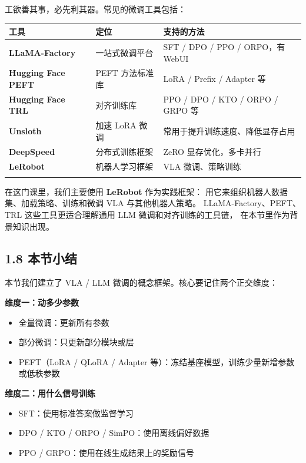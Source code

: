 \documentclass[
  chinese,
]{ctexart}
\providecommand{\tightlist}{%
  \setlength{\itemsep}{0pt}\setlength{\parskip}{0pt}}
\begin{document}
工欲善其事，必先利其器。常见的微调工具包括：

\begin{center}
\begin{tabular}{@{}>{\raggedright\arraybackslash}p{} >{\raggedright\arraybackslash}p{} >{\raggedright\arraybackslash}p{}@{}}
\toprule\noalign{}
工具 & 定位 & 支持的方法 \\
\midrule\noalign{}
\textbf{LLaMA-Factory} & 一站式微调平台 & SFT / DPO / PPO / ORPO，有 WebUI \\
\textbf{Hugging Face PEFT} & PEFT 方法标准库 & LoRA / Prefix / Adapter 等 \\
\textbf{Hugging Face TRL} & 对齐训练库 & PPO / DPO / KTO / ORPO / GRPO 等 \\
\textbf{Unsloth} & 加速 LoRA 微调 & 常用于提升训练速度、降低显存占用 \\
\textbf{DeepSpeed} & 分布式训练框架 & ZeRO 显存优化，多卡并行 \\
\textbf{LeRobot} & 机器人学习框架 & VLA 微调、策略训练 \\
\bottomrule\noalign{}
\end{tabular}
\end{center}

在这门课里，我们主要使用 \textbf{LeRobot} 作为实践框架：
用它来组织机器人数据集、加载策略、训练和微调 VLA 与其他机器人策略。
LLaMA-Factory、PEFT、TRL 这些工具更适合理解通用 LLM
微调和对齐训练的工具链， 在本节里作为背景知识出现。

\subsection{1.8 本节小结}\label{ux672cux8282ux5c0fux7ed3}

本节我们建立了 VLA / LLM 微调的概念框架。核心要记住两个正交维度：

\textbf{维度一：动多少参数}

\begin{itemize}
\tightlist
\item
  全量微调：更新所有参数
\item
  部分微调：只更新部分模块或层
\item
  PEFT（LoRA / QLoRA / Adapter
  等）：冻结基座模型，训练少量新增参数或低秩参数
\end{itemize}

\textbf{维度二：用什么信号训练}

\begin{itemize}
\tightlist
\item
  SFT：使用标准答案做监督学习
\item
  DPO / KTO / ORPO / SimPO：使用离线偏好数据
\item
  PPO / GRPO：使用在线生成结果上的奖励信号
\end{itemize}
\end{document}
